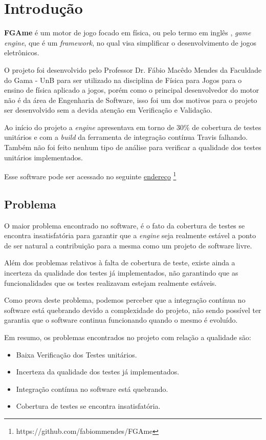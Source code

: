 \chapter[Introdução]{Introdução}
\textbf{FGAme} é um motor de jogo focado em física, ou pelo termo em inglês , \textit{game} \textit{engine}, que é um \textit{framework}, no qual visa simplificar o desenvolvimento de jogos eletrônicos.

O projeto foi desenvolvido pelo Professor Dr. Fábio Macêdo Mendes da Faculdade do Gama - UnB para ser utilizado na disciplina de Física para Jogos para o ensino de física aplicado a jogos, porém como o principal desenvolvedor do motor não é da área de Engenharia de Software, isso foi um dos motivos para o projeto ser desenvolvido sem a devida atenção em Verificação e Validação.

Ao início do projeto a \textit{engine} apresentava em torno de 30\% de cobertura de testes unitários e com a \textit{build} da ferramenta de integração contínua Travis falhando. Também não foi feito nenhum tipo de análise para verificar a qualidade dos testes unitários implementados.

Esse software pode ser acessado no seguinte \href{https://github.com/fabiommendes/FGAme}{endereço}%
\footnote{https://github.com/fabiommendes/FGAme}

\section{Problema}

O maior problema encontrado no software, é o fato da cobertura de testes se encontra insatisfatória para garantir que a \textit{engine} seja realmente estável a ponto de ser natural a contribuição para a mesma como um projeto de software livre.

Além dos problemas relativos à falta de cobertura de teste, existe ainda a incerteza da qualidade dos testes já implementados, não garantindo que as funcionalidades que os testes realizavam estejam realmente estáveis.

Como prova deste problema, podemos perceber que a integração contínua no software está quebrando devido a complexidade do projeto, não sendo possível ter garantia que o software continua funcionando quando o mesmo é evoluído.

Em resumo, os problemas encontrados no projeto com relação a qualidade são:
\begin{itemize}
\item Baixa Verificação dos Testes unitários.
\item Incerteza da qualidade dos testes já implementados.
\item Integração contínua no software está quebrando.
\item Cobertura de testes se encontra insatisfatória.
\end{itemize}


